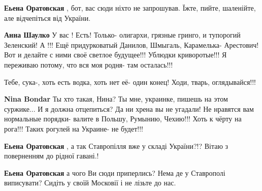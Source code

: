\begin{itemize}
\begin{itemize}
\begin{itemize}
\textbf{Еьена Оратовская} , бот, вас сюди ніхто не запрошував. Їжте, пийте, шаленійте, але відчепіться від України.

 
\textbf{Анна Шаулко} У вас ! Есть! Только- олигархи, грязные гринго, и тупорогий Зеленский! А !!! Ещё придурковатый Данилов, Шмыгаль, Карамелька- Арестович! Вот и делайте с ними своё светлое будущее!!! Ублюдки криворотые!!! Я переживаю потому, что вся моя родня- там осталась!!!

 
Тебе, сука-, хоть есть водка, хоть нет её- один конец! Ходи, тварь, оглядывайся!!!

 
\textbf{Nina Bondar} Ты хто такая, Нина? Ты мне, украинке, пишешь на этом суржике... И я должна отцепиться? Да ни хрена вы не угадали! Не нравятся вам нормальные порядки- валите в Польшу, Румынию, Чехию!!! Хоть к чёрту на рога!!! Таких рогулей на Украине- не будет!!!

 
\textbf{Еьена Оратовская} , а так Ставропілля вже у складі України?!? Вітаю з поверненням до рідної гавані.!

 
\textbf{Еьена Оратовская} а чого Ви сюди приперлись? Нема де у Ставрополі виписувати? Сидіть у своїй Московії і не лізьте до нас.


\end{itemize}
\end{itemize}
\end{itemize}
